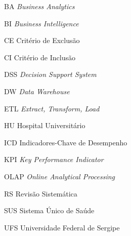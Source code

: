 
\begin{siglas}
	\item[BA]{\textit{Business Analytics}}
    \item[BI]{\textit{Business Intelligence}}
    \item[CE]{Critério de Exclusão}
    \item[CI]{Critério de Inclusão}
    \item[DSS]{\textit{Decision Support System}}
    \item[DW]{\textit{Data Warehouse}}
    \item[ETL]{\textit{Extract, Transform, Load}}
  	\item[HU]{Hospital Universitário}
  	\item[ICD]{Indicadores-Chave de Desempenho}
    \item[KPI]{\textit{Key Performance Indicator}}
    \item[OLAP]{\textit{Online Analytical Processing}}
    \item[RS]{Revisão Sistemática}
    \item[SUS]{Sistema Único de Saúde}
	\item[UFS]{Universidade Federal de Sergipe}
	\item[]{}
\end{siglas}
